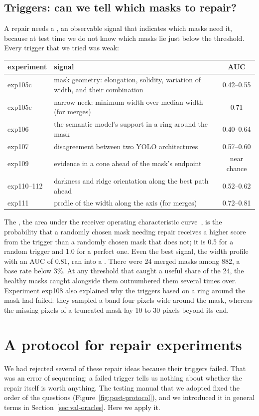\subsection{Triggers: can we tell which masks to repair?}\label{sec:post-triggers}
A repair needs a , an observable signal that indicates which masks need it, because
at test time we do not know which masks lie just below the threshold. Every trigger that we tried was
weak:
\begin{center}\small
\begin{tabularx}{\textwidth}{@{}lXc@{}}
\toprule
experiment & signal & AUC \\
\midrule
exp105c & mask geometry: elongation, solidity, variation of width, and their combination & 0.42--0.55 \\
exp105c & narrow neck: minimum width over median width (for merges) & 0.71 \\
exp106 & the semantic model's support in a ring around the mask & 0.40--0.64 \\
exp107 & disagreement between two YOLO architectures & 0.57--0.60 \\
exp109 & evidence in a cone ahead of the mask's endpoint & near chance \\
exp110--112 & darkness and ridge orientation along the best path ahead & 0.52--0.62 \\
exp111 & profile of the width along the axis (for merges) & 0.72--0.81 \\
\bottomrule
\end{tabularx}
\end{center}
The , the area under the receiver operating characteristic
curve~\citep{hanley1982,fawcett2006}, is the probability
that a randomly chosen mask needing repair receives a higher score from the trigger than a randomly
chosen mask that does not; it is 0.5 for a random trigger and 1.0 for a perfect one. Even the best
signal, the width profile with an AUC of 0.81, ran into a . There were 24
merged masks among 882, a base rate below 3\%. At any threshold that caught a useful share of the 24,
the healthy masks caught alongside them outnumbered them several times over. Experiment exp108 also
explained why the triggers based on a ring around the mask had failed: they sampled a band four pixels
wide around the mask, whereas the missing pixels of a truncated mask lay 10 to 30 pixels beyond its
end.

\section{A protocol for repair experiments}\label{sec:post-protocol}
We had rejected several of these repair ideas because their triggers failed. That was an error of
sequencing: a failed trigger tells us nothing about whether the repair itself is worth anything. The
testing manual that we adopted fixed the order of the questions (Figure~\ref{fig:post-protocol}),
and we introduced it in general terms in Section~\ref{sec:val-oracles}. Here we apply it.

